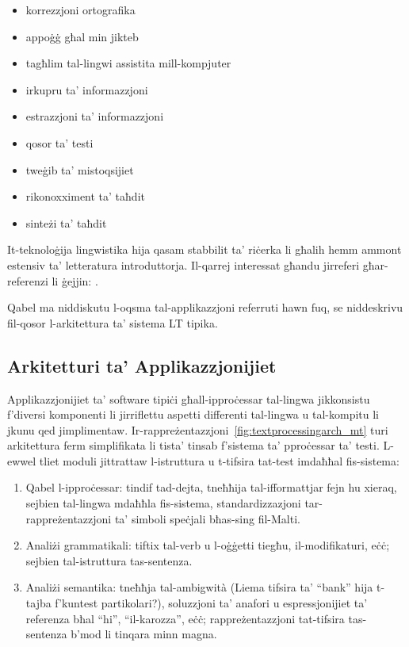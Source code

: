 \documentclass[]{../../metanetpaper}
\begin{document}
\begin{multicols}{2}
\begin{itemize}
\item korrezzjoni ortografika
\item appoġġ għal min jikteb
\item tagħlim tal-lingwi assistita mill-kompjuter
\item irkupru ta' informazzjoni
\item estrazzjoni ta' informazzjoni
\item qosor ta' testi
\item tweġib ta' mistoqsijiet
\item rikonoxximent ta' taħdit  
\item sinteżi ta' taħdit 
\end{itemize}

It-teknoloġija lingwistika hija qasam stabbilit ta' riċerka li għalih hemm ammont estensiv ta' letteratura introduttorja. Il-qarrej interessat għandu jirreferi għar-referenzi li ġejjin:  \cite{carstensen-etal1, jurafsky-martin01, manning-schuetze1, lt-world1, lt-survey1}.

Qabel ma niddiskutu l-oqsma tal-applikazzjoni referruti hawn fuq, se niddeskrivu fil-qosor l-arkitettura ta' sistema LT tipika. 

\subsection{Arkitetturi ta’ Applikazzjonijiet}

Applikazzjonijiet ta’ software tipiċi għall-ipproċessar tal-lingwa jikkonsistu f'diversi komponenti li jirriflettu aspetti differenti tal-lingwa u tal-kompitu li jkunu qed jimplimentaw. Ir-rappreżentazzjoni~\ref{fig:textprocessingarch_mt}  turi arkitettura ferm simplifikata li tista’ tinsab f’sistema ta’ pproċessar ta’ testi. L-ewwel tliet moduli jittrattaw l-istruttura u t-tifsira tat-test imdaħħal fis-sistema: 

\begin{enumerate}
\item Qabel l-ipproċessar: tindif tad-dejta, tneħħija tal-ifformattjar fejn hu xieraq, sejbien tal-lingwa mdaħħla fis-sistema, standardizzazjoni tar-rappreżentazzjoni ta’ simboli speċjali bħas-sing fil-Malti.
\item Analiżi grammatikali:  tiftix tal-verb u l-oġġetti tiegħu, il-modifikaturi, eċċ;  sejbien tal-istruttura tas-sentenza.
\item Analiżi semantika: tneħħja tal-ambigwità (Liema tifsira ta’ “bank” hija t-tajba f’kuntest partikolari?), soluzzjoni ta’ anafori u espressjonijiet ta' referenza bħal “hi”, “il-karozza”, eċċ; rappreżentazzjoni tat-tifsira tas-sentenza b’mod li tinqara minn magna.
\end{enumerate}


\end{multicols}
\end{document}
